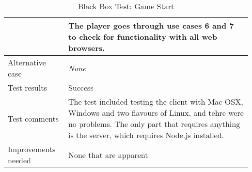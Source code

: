 {\begin{table}[H]
\begin{tabular}{| p{5cm} | p{10cm} |}
		& The player goes through use cases 6 and 7 to check for functionality with all web browsers.\\ \hline
	Alternative case
		& \emph{None}\\ \hline
	Test results 
		& Success \\ \hline
	Test comments
		& The test included testing the client with Mac OSX, Windows and two flavours of Linux, and tehre were no problems. 
			The only part that requires anything is the server, which requires Node.js installed. \\ \hline
	Improvements needed
		& None that are apparent\\ \hline
\end{tabular}

\caption{Black Box Test: Game Start}
\label{fig:black_box_test_9}
\end{table}}










